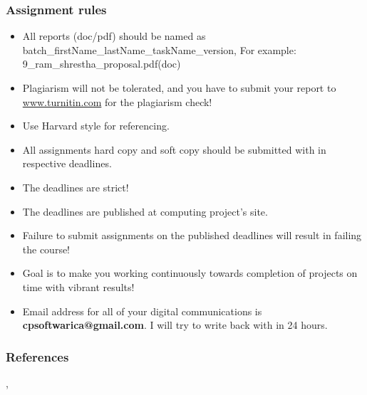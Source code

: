 \documentclass{beamer}
\begin{document}
\begin{frame}[t]\frametitle{Assignment rules}
\begin{itemize}
    \item All reports (doc/pdf) should be named as batch\_firstName\_lastName\_taskName\_version, For example: 9\_ram\_shrestha\_proposal.pdf(doc)
    \item Plagiarism will not be tolerated, and you have to submit your report to \url{www.turnitin.com} for the plagiarism check!
    \item Use Harvard style for referencing.
    \item All assignments hard copy and soft copy should be submitted with in respective deadlines.
    \item The deadlines are strict!
    \item The deadlines are published at computing project's site.
    \item Failure to submit assignments on the published deadlines will result in failing the course!
    \item Goal is to make you working continuously towards completion of projects on time with vibrant results!
    \item Email address for all of your digital communications is \textbf{cpsoftwarica@gmail.com}. I will try to write back with in 24 hours.
\end{itemize}
\end{frame}



\begin{frame}[t]\frametitle{References}
\cite{dawson2005projects}, \cite{weaver2004success}



\end{frame}
\end{document}
